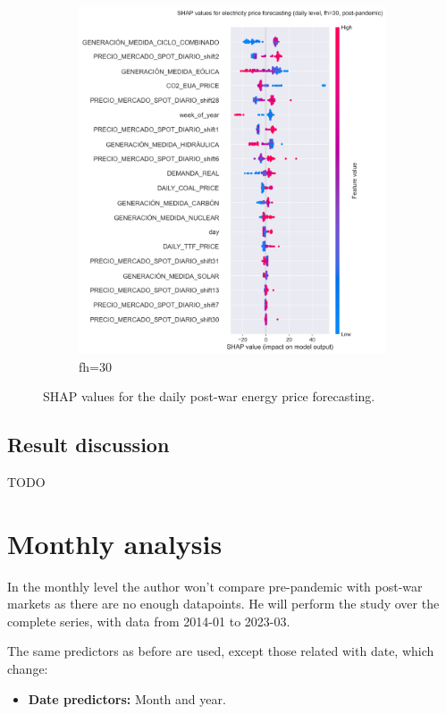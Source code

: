 \begin{figure}[H]
\begin{subfigure}{.45\textwidth}
        \includegraphics[width=1\linewidth]{images/analysis/shap-daily-post-30}
        \caption{fh=30}
    \end{subfigure}

    \caption{SHAP values for the daily post-war energy price forecasting.}
    \label{fig:shap-daily-post}
\end{figure}

\subsection{Result discussion}
TODO



\section{Monthly analysis}
In the monthly level the author won't compare pre-pandemic with post-war markets as there are no enough datapoints. He will perform the study over the complete series, with data from 2014-01 to 2023-03.

The same predictors as before are used, except those related with date, which change:
\begin{itemize}
    \item \textbf{Date predictors:} Month and year.
\end{itemize}


